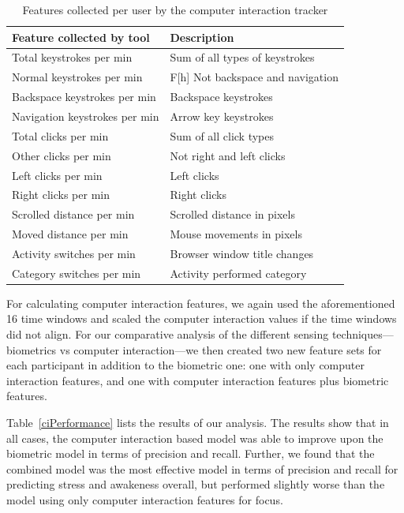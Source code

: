 \begin{table}
\begin{center}
\small\addtolength{\tabcolsep}{-1pt}
\begin{tabular}{l l}
\hline

Feature collected by tool & Description \\ 
\hline
Total keystrokes per min& Sum of all types of keystrokes \\ 
Normal keystrokes per min&F[h] Not backspace and navigation \\ 
Backspace keystrokes per min& Backspace keystrokes \\ 
Navigation keystrokes per min& Arrow key keystrokes \\ 
Total clicks per min& Sum of all click types \\ 
Other clicks per min& Not right and left clicks \\ 
Left clicks per min& Left clicks \\ 
Right clicks per min& Right clicks \\ 
Scrolled distance per min& Scrolled distance in pixels \\ 
Moved distance per min& Mouse movements in pixels \\ 
Activity switches per min& Browser window title changes \\ 
Category switches per min& Activity performed category \\ 
\hline
\end{tabular}
\caption{Features collected per user by the computer interaction tracker}%
\label{tracker}
\end{center}
\vspace*{-1mm}
\end{table}

For calculating computer interaction features, we again used the aforementioned 16 time windows and scaled the computer interaction values if the time windows did not align. For our comparative analysis of the different sensing techniques---biometrics vs computer interaction---we then created two new feature sets for each participant in addition to the biometric one: one with only computer interaction features, and one with computer interaction features plus biometric features. 

Table~\ref{ciPerformance} lists the results of our analysis. The results show that in all cases, the computer interaction based model was able to improve upon the biometric model in terms of precision and recall.
Further, we found that the combined model was the most effective model in terms of precision and recall for predicting stress and awakeness overall, but performed slightly worse than the model using only computer interaction features for focus. 


